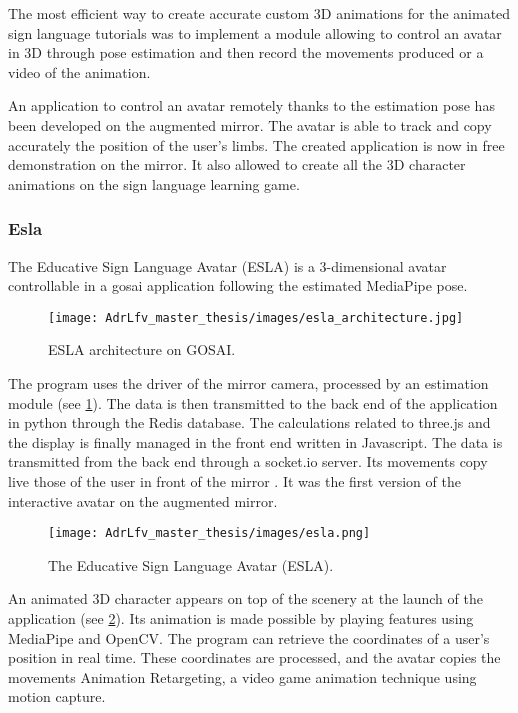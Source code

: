 The most efficient way to create accurate custom 3D animations for the animated sign language tutorials was to implement a module allowing to control an avatar in 3D through pose estimation and then record the movements produced or a video of the animation.

An application to control an avatar remotely thanks to the estimation pose has been developed on the augmented mirror. The avatar is able to track and copy accurately the position of the user's limbs. The created application is now in free demonstration on the mirror. It also allowed to create all the 3D character animations on the sign language learning game.

\subsubsection{Esla}

The Educative Sign Language Avatar (ESLA) is a 3-dimensional avatar controllable in a gosai application following the estimated MediaPipe pose. 

\begin{figure}[h]
    \centering
    \texttt{[image: AdrLfv\_master\_thesis/images/esla\_architecture.jpg]}
    \caption{ESLA architecture on GOSAI.}
    \label{fig:esla_architecture}
\end{figure}

The program uses the driver of the mirror camera, processed by an estimation module (see \ref{fig:esla_architecture}). The data is then transmitted to the back end of the application in python through the Redis database. The calculations related to three.js and the display is finally managed in the front end written in Javascript. The data is transmitted from the back end through a socket.io server.
Its movements copy live those of the user in front of the mirror \cite{esla}. It was the first version of the interactive avatar on the augmented mirror.


\begin{figure}[h]
    \centering
    \texttt{[image: AdrLfv\_master\_thesis/images/esla.png]}
    \caption{The Educative Sign Language Avatar (ESLA).}
    \label{fig:esla}
\end{figure}


An animated 3D character appears on top of the scenery at the launch of the application (see \ref{fig:esla}). Its animation is made possible by playing features using MediaPipe and OpenCV. The program can retrieve the coordinates of a user’s position in real time. These coordinates are processed, and the avatar copies the movements Animation Retargeting, a video game animation technique using motion capture.

